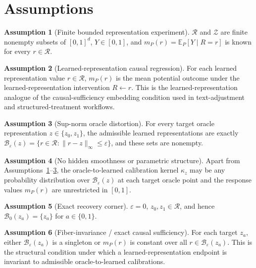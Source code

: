 \documentclass[11pt]{article}
\newcommand{\E}{\mathbb{E}}
\theoremstyle{definition}
\newtheorem{assumption}{Assumption}
\theoremstyle{plain}
\theoremstyle{remark}
\begin{document}
\section{Assumptions}
\begin{assumption}[Finite bounded representation experiment]\label{ass:finite-bounded}
\(\mathcal R\) and \(\mathcal Z\) are finite nonempty subsets of \([0,1]^d\), \(Y\in[0,1]\), and \(m_P(r)=\E_P[Y\mid R=r]\) is known for every \(r\in\mathcal R\).
\end{assumption}

\begin{assumption}[Learned-representation causal regression]\label{ass:learned-causal-regression}
For each learned representation value \(r\in\mathcal R\), \(m_P(r)\) is the mean potential outcome under the learned-representation intervention \(R\leftarrow r\). This is the learned-representation analogue of the causal-sufficiency embedding condition used in text-adjustment and structured-treatment workflows.
\end{assumption}

\begin{assumption}[Sup-norm oracle distortion]\label{ass:supnorm-distortion}
For every target oracle representation \(z\in\{z_0,z_1\}\), the admissible learned representations are exactly
\(\mathcal B_\varepsilon(z)=\{r\in\mathcal R:\|r-z\|_\infty\le\varepsilon\}\), and these sets are nonempty.
\end{assumption}

\begin{assumption}[No hidden smoothness or parametric structure]\label{ass:no-extra-structure}
Apart from Assumptions~\ref{ass:finite-bounded}--\ref{ass:supnorm-distortion}, the oracle-to-learned calibration kernel \(\kappa_z\) may be any probability distribution over \(\mathcal B_\varepsilon(z)\) at each target oracle point and the response values \(m_P(r)\) are unrestricted in \([0,1]\).
\end{assumption}

\begin{assumption}[Exact recovery corner]\label{ass:exact-recovery}
\(\varepsilon=0\), \(z_0,z_1\in\mathcal R\), and hence \(\mathcal B_0(z_a)=\{z_a\}\) for \(a\in\{0,1\}\).
\end{assumption}

\begin{assumption}[Fiber-invariance / exact causal sufficiency]\label{ass:fiber-invariance}
For each target \(z_a\), either \(\mathcal B_\varepsilon(z_a)\) is a singleton or \(m_P(r)\) is constant over all \(r\in\mathcal B_\varepsilon(z_a)\). This is the structural condition under which a learned-representation endpoint is invariant to admissible oracle-to-learned calibrations.
\end{assumption}
\end{document}
